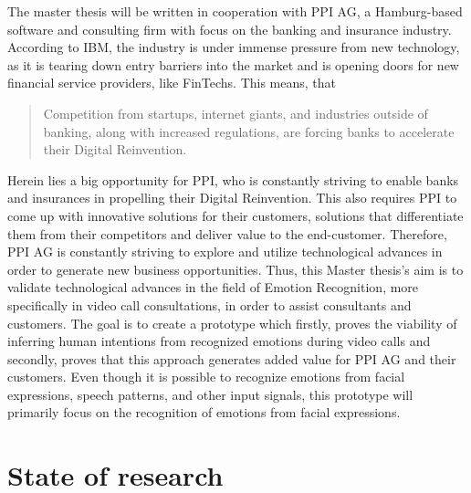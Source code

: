 \documentclass[11pt,a4paper]{scrbook}
\begin{document}
The master thesis will be written in cooperation with PPI AG, a Hamburg-based software and consulting firm with focus on the banking and insurance industry. According to IBM, the industry is under immense pressure from new technology, as it is tearing down entry barriers into the market and is opening doors for new financial service providers, like FinTechs.\cite{IBM:2020:TheImpactOfDigitization} This means, that
\begin{quote}
Competition from startups, internet giants, and industries outside of banking, along with increased regulations, are forcing banks to accelerate their Digital Reinvention.\cite{IBM:2020:TheImpactOfDigitization}
\end{quote}
\vspace{0.1cm}
Herein lies a big opportunity for PPI, who is constantly striving to enable banks and insurances in propelling their Digital Reinvention. This also requires PPI to come up with innovative solutions for their customers, solutions that differentiate them from their competitors and deliver value to the end-customer.
\newline\newline
Therefore, PPI AG is constantly striving to explore and utilize technological advances in order to generate new business opportunities. Thus, this Master thesis's aim is to validate technological advances in the field of Emotion Recognition, more specifically in video call consultations, in order to assist consultants and customers. The goal is to create a prototype which firstly, proves the viability of inferring human intentions from recognized emotions during video calls and secondly, proves that this approach generates added value for PPI AG and their customers.
\newline\newline
Even though it is possible to recognize emotions from facial expressions, speech patterns, and other input signals, this prototype will primarily focus on the recognition of emotions from facial expressions.


\chapter{State of research}

\end{document}
